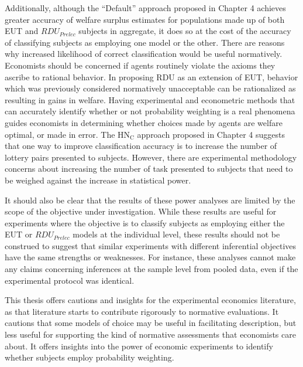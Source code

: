 \documentclass[../main.tex]{subfiles}
\begin{document}
Additionally, although the \enquote{Default} approach proposed in Chapter 4 achieves greater accuracy of welfare surplus estimates for populations made up of both EUT and $\mathit{RDU_{Prelec}}$ subjects in aggregate, it does so at the cost of the accuracy of classifying subjects as employing one model or the other.
There are reasons why increased likelihood of correct classification would be useful normatively.
Economists should be concerned if agents routinely violate the axioms they ascribe to rational behavior.
In proposing RDU as an extension of EUT, behavior which was previously considered normatively unacceptable can be rationalized as resulting in gains in welfare.
Having experimental and econometric methods that can accurately identify whether or not probability weighting is a real phenomena guides economists in determining whether choices made by agents are welfare optimal, or made in error.
The $\text{HN}_\text{C}$ approach proposed in Chapter 4 suggests that one way to improve classification accuracy is to increase the number of lottery pairs presented to subjects.
However, there are experimental methodology concerns about increasing the number of task presented to subjects that need to be weighed against the increase in statistical power.

It should also be clear that the results of these power analyses are limited by the scope of the objective under investigation.
While these results are useful for experiments where the objective is to classify subjects as employing either the EUT or $\mathit{RDU_{Prelec}}$ models at the individual level, these results should not be construed to suggest that similar experiments with different inferential objectives have the same strengths or weaknesses.
For instance, these analyses cannot make any claims concerning inferences at the sample level from pooled data, even if the experimental protocol was identical.

This thesis offers cautions and insights for the experimental economics literature, as that literature starts to contribute rigorously to normative evaluations.
It cautions that some models of choice may be useful in facilitating description, but less useful for supporting the kind of normative assessments that economists care about.
It offers insights into the power of economic experiments to identify whether subjects employ probability weighting.

\onlyinsubfile{
\newpage
\printbibliography[segment=5, heading=subbibliography]
}
\end{document}
